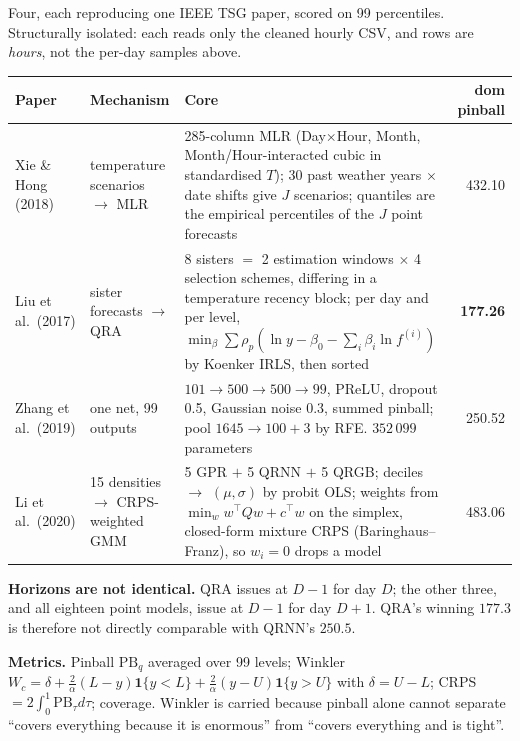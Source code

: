 \documentclass[11pt]{article}
\newcommand{\ind}{\mathbf{1}}
\begin{document}
Four, each reproducing one IEEE TSG paper, scored on 99 percentiles. Structurally
isolated: each reads only the cleaned hourly CSV, and rows are \emph{hours}, not the
per-day samples above.

\begin{center}\small
\begin{tabular}{@{}llp{6.2cm}r@{}}
\toprule
Paper & Mechanism & Core & dom pinball \\
\midrule
Xie \& Hong (2018) & temperature scenarios $\to$ MLR
  & 285-column MLR (Day$\times$Hour, Month, Month/Hour-interacted cubic in
    standardised $T$); 30 past weather years $\times$ date shifts give $J$ scenarios;
    quantiles are the empirical percentiles of the $J$ point forecasts & 432.10 \\
\addlinespace
Liu et al.\ (2017) & sister forecasts $\to$ QRA
  & 8 sisters $=$ 2 estimation windows $\times$ 4 selection schemes, differing in a
    temperature recency block; per day and per level,
    $\min_\beta \sum \rho_p(\ln y - \beta_0 - \sum_i \beta_i \ln f^{(i)})$ by Koenker
    IRLS, then sorted & \textbf{177.26} \\
\addlinespace
Zhang et al.\ (2019) & one net, 99 outputs
  & $101 \to 500 \to 500 \to 99$, PReLU, dropout 0.5, Gaussian noise $0.3$, summed
    pinball; pool $1645 \to 100{+}3$ by RFE. $352\,099$ parameters & 250.52 \\
\addlinespace
Li et al.\ (2020) & 15 densities $\to$ CRPS-weighted GMM
  & 5 GPR $+$ 5 QRNN $+$ 5 QRGB; deciles $\to$ $(\mu,\sigma)$ by probit OLS; weights
    from $\min_w w^{\!\top}Qw + c^{\!\top}w$ on the simplex, closed-form mixture CRPS
    (Baringhaus--Franz), so $w_i = 0$ drops a model & 483.06 \\
\bottomrule
\end{tabular}
\end{center}

\noindent
\textbf{Horizons are not identical.} QRA issues at $D{-}1$ for day $D$; the other
three, and all eighteen point models, issue at $D{-}1$ for day $D{+}1$. QRA's winning
$177.3$ is therefore not directly comparable with QRNN's $250.5$.

\noindent
\textbf{Metrics.} Pinball $\mathrm{PB}_q$ averaged over 99 levels; Winkler
$W_c = \delta + \frac{2}{\alpha}(L-y)\ind\{y<L\} + \frac{2}{\alpha}(y-U)\ind\{y>U\}$
with $\delta = U-L$; CRPS $= 2\int_0^1 \mathrm{PB}_\tau d\tau$; coverage. Winkler is
carried because pinball alone cannot separate ``covers everything because it is
enormous'' from ``covers everything and is tight''.
\end{document}
